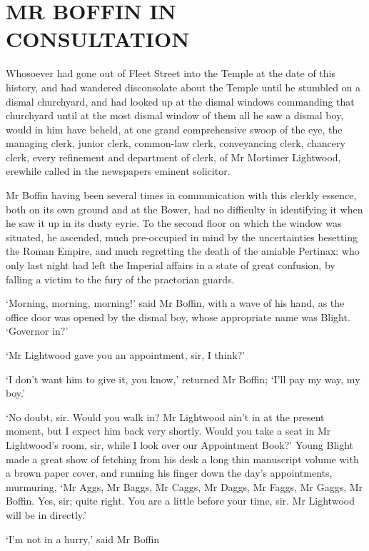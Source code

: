 
\chapter{MR BOFFIN IN CONSULTATION}

Whosoever had gone out of Fleet Street into the Temple at the date of
this history, and had wandered disconsolate about the Temple until he
stumbled on a dismal churchyard, and had looked up at the dismal windows
commanding that churchyard until at the most dismal window of them
all he saw a dismal boy, would in him have beheld, at one grand
comprehensive swoop of the eye, the managing clerk, junior clerk,
common-law clerk, conveyancing clerk, chancery clerk, every refinement
and department of clerk, of Mr Mortimer Lightwood, erewhile called in
the newspapers eminent solicitor.

Mr Boffin having been several times in communication with this clerkly
essence, both on its own ground and at the Bower, had no difficulty in
identifying it when he saw it up in its dusty eyrie. To the second floor
on which the window was situated, he ascended, much pre-occupied in mind
by the uncertainties besetting the Roman Empire, and much regretting the
death of the amiable Pertinax: who only last night had left the Imperial
affairs in a state of great confusion, by falling a victim to the fury
of the praetorian guards.

‘Morning, morning, morning!’ said Mr Boffin, with a wave of his hand, as
the office door was opened by the dismal boy, whose appropriate name was
Blight. ‘Governor in?’

‘Mr Lightwood gave you an appointment, sir, I think?’

‘I don’t want him to give it, you know,’ returned Mr Boffin; ‘I’ll pay
my way, my boy.’

‘No doubt, sir. Would you walk in? Mr Lightwood ain’t in at the present
moment, but I expect him back very shortly. Would you take a seat in Mr
Lightwood’s room, sir, while I look over our Appointment Book?’
Young Blight made a great show of fetching from his desk a long thin
manuscript volume with a brown paper cover, and running his finger down
the day’s appointments, murmuring, ‘Mr Aggs, Mr Baggs, Mr Caggs, Mr
Daggs, Mr Faggs, Mr Gaggs, Mr Boffin. Yes, sir; quite right. You are a
little before your time, sir. Mr Lightwood will be in directly.’

‘I’m not in a hurry,’ said Mr Boffin

